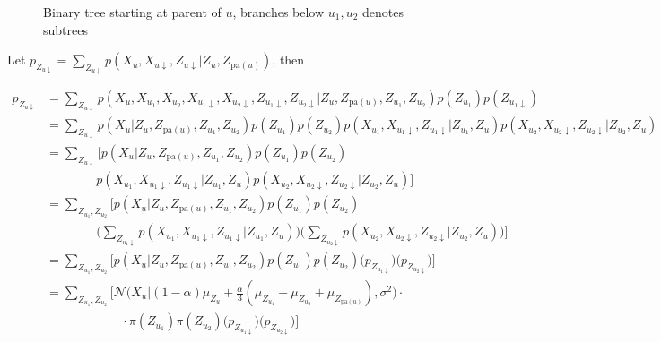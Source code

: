 \begin{figure}[H]
\begin{center}
\end{center}
  \caption{Binary tree starting at parent of $u$, branches below $u_1, u_2$ denotes subtrees}
  \label{within_tree}
\end{figure}

Let $p_{Z_{u \downarrow}} = \sum_{Z_{u \downarrow}} p(X_u, X_{u \downarrow}, Z_{u \downarrow}|Z_u, Z_{\text{pa}(u)})$, then

\begin{align}
  p_{Z_{u \downarrow}} & = \sum_{Z_{u \downarrow}} p(X_u, X_{u_1}, X_{u_2}, X_{u_1 \downarrow}, X_{u_2 \downarrow}, Z_{u_1 \downarrow}, Z_{u_2 \downarrow}|Z_u, Z_{\text{pa}(u)}, Z_{u_1}, Z_{u_2})p(Z_{u_1}) p(Z_{u_1\downarrow}) \nonumber \\
  & = \sum_{Z_{u \downarrow}} p(X_u|Z_u, Z_{\text{pa}(u)}, Z_{u_1}, Z_{u_2}) p(Z_{u_1})p(Z_{u_2})p(X_{u_1}, X_{u_1\downarrow}, Z_{u_1\downarrow}|Z_{u_1}, Z_u) p(X_{u_2}, X_{u_2\downarrow}, Z_{u_2\downarrow}|Z_{u_2}, Z_u) \nonumber\\
  & = \sum_{Z_{u \downarrow}} \bigg[ p(X_u|Z_u, Z_{\text{pa}(u)}, Z_{u_1}, Z_{u_2})p(Z_{u_1})p(Z_{u_2}) \nonumber\\
  & \qquad\qquad p(X_{u_1}, X_{u_1\downarrow}, Z_{u_1\downarrow}|Z_{u_1}, Z_u) p(X_{u_2}, X_{u_2\downarrow}, Z_{u_2\downarrow}|Z_{u_2}, Z_u) \bigg] \nonumber\\
  & = \sum_{Z_{u_1}, Z_{u_2}} \bigg[ p(X_u|Z_u, Z_{\text{pa}(u)}, Z_{u_1}, Z_{u_2})p(Z_{u_1})p(Z_{u_2}) \nonumber\\
  & \qquad\qquad
  \Big( \sum_{Z_{u_1\downarrow}} p(X_{u_1}, X_{u_1\downarrow}, Z_{u_1\downarrow}|Z_{u_1}, Z_u) \Big)
  \Big( \sum_{Z_{u_2\downarrow}} p(X_{u_2}, X_{u_2\downarrow}, Z_{u_2\downarrow}|Z_{u_2}, Z_u)\Big) \bigg] \nonumber\\
  & = \sum_{Z_{u_1}, Z_{u_2}} \bigg[ p(X_u|Z_u, Z_{\text{pa}(u)}, Z_{u_1}, Z_{u_2})p(Z_{u_1})p(Z_{u_2}) \Big(p_{Z_{u_1\downarrow}}\Big) \Big( p_{Z_{u_2\downarrow}}\Big)\bigg] \nonumber \\
  & = \sum_{Z_{u_1}, Z_{u_2}} \bigg[ \mathcal{N}\Big(X_u|(1-\alpha)\mu_{Z_u} +\frac{\alpha}{3}(\mu_{Z_{u_1}}+\mu_{Z_{u_2}}+\mu_{Z_{\text{pa}(u)}}), \sigma^2 \Big) \cdot \nonumber\\
  & \qquad\qquad\qquad  \cdot \pi(Z_{u_1}) \pi(Z_{u_2}) \Big(p_{Z_{u_1\downarrow}}\Big) \Big( p_{Z_{u_2\downarrow}}\Big)\bigg]\nonumber
\end{align}


